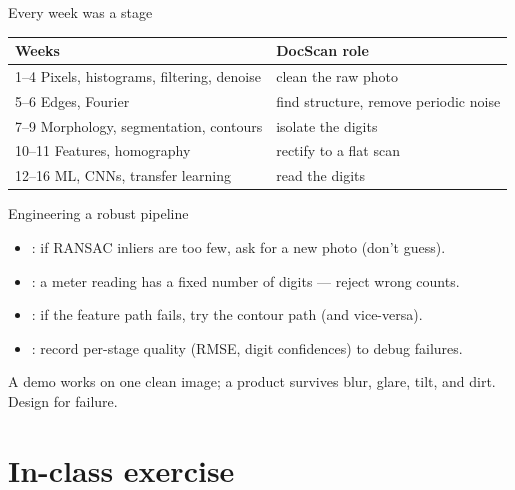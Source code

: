 \documentclass[10pt,aspectratio=169]{beamer}
\begin{document}
\begin{frame}{Every week was a stage}
  \begin{center}
  \begin{tabular}{@{}ll@{}}
    \toprule
    \textbf{Weeks} & \textbf{DocScan role} \\
    \midrule
    1--4 Pixels, histograms, filtering, denoise & clean the raw photo \\
    5--6 Edges, Fourier & find structure, remove periodic noise \\
    7--9 Morphology, segmentation, contours & isolate the digits \\
    10--11 Features, homography & rectify to a flat scan \\
    12--16 ML, CNNs, transfer learning & read the digits \\
    \bottomrule
  \end{tabular}
  \end{center}
\end{frame}

\begin{frame}{Engineering a robust pipeline}
  \begin{itemize}
    \item {}: if RANSAC inliers are too few, ask for a new photo (don't guess).
    \item {}: a meter reading has a fixed number of digits — reject wrong counts.
    \item {}: if the feature path fails, try the contour path (and vice-versa).
    \item {}: record per-stage quality (RMSE, digit confidences) to debug failures.
  \end{itemize}
  \begin{badbox}
    A demo works on one clean image; a product survives blur, glare, tilt, and dirt. Design for failure.
  \end{badbox}
\end{frame}

\section{In-class exercise}
\end{document}
